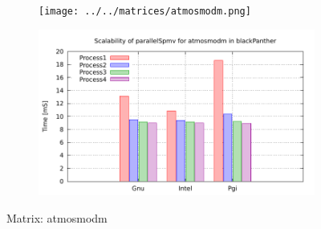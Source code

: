 \begin{figure} [ht!]
    \centering
    \captionsetup{justification=centering, singlelinecheck=false}
    \begin{subfigure}{.65\textwidth}
      \centering
      \hspace*{-3.5cm} 
      \texttt{[image: ../../matrices/atmosmodm.png]}
      \label{fig:atmosmodm_matrix}
    \end{subfigure}%
    \begin{subfigure}{.65\textwidth}
      \centering
      \hspace*{-6.0cm} 
      \includegraphics[page=1, width=0.95\linewidth]{../plots/blackPanther.pdf}
      \label{fig:atmosmodm_performance}
    \end{subfigure}
\caption{Matrix: atmosmodm}
\label{fig:atmosmodm}
\end{figure}

